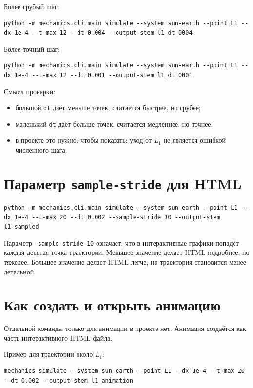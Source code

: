 \documentclass[a4paper,12pt]{article}
\begin{document}
Более грубый шаг:

\begin{lstlisting}
python -m mechanics.cli.main simulate --system sun-earth --point L1 --dx 1e-4 --t-max 12 --dt 0.004 --output-stem l1_dt_0004
\end{lstlisting}

Более точный шаг:

\begin{lstlisting}
python -m mechanics.cli.main simulate --system sun-earth --point L1 --dx 1e-4 --t-max 12 --dt 0.001 --output-stem l1_dt_0001
\end{lstlisting}

Смысл проверки:

\begin{itemize}[leftmargin=1.2cm]
  \item большой \texttt{dt} даёт меньше точек, считается быстрее, но грубее;
  \item маленький \texttt{dt} даёт больше точек, считается медленнее, но точнее;
  \item в проекте это нужно, чтобы показать: уход от $L_1$ не является ошибкой численного шага.
\end{itemize}

\section{Параметр \texttt{sample-stride} для HTML}

\begin{lstlisting}
python -m mechanics.cli.main simulate --system sun-earth --point L1 --dx 1e-4 --t-max 20 --dt 0.002 --sample-stride 10 --output-stem l1_sampled
\end{lstlisting}

Параметр \texttt{--sample-stride 10} означает, что в интерактивные графики
попадёт каждая десятая точка траектории. Меньшее значение делает HTML подробнее,
но тяжелее. Большее значение делает HTML легче, но траектория становится менее
детальной.

\section{Как создать и открыть анимацию}

Отдельной команды только для анимации в проекте нет. Анимация создаётся как
часть интерактивного HTML-файла.

Пример для траектории около $L_1$:

\begin{lstlisting}
mechanics simulate --system sun-earth --point L1 --dx 1e-4 --t-max 20 --dt 0.002 --output-stem l1_animation
\end{lstlisting}
\end{document}
